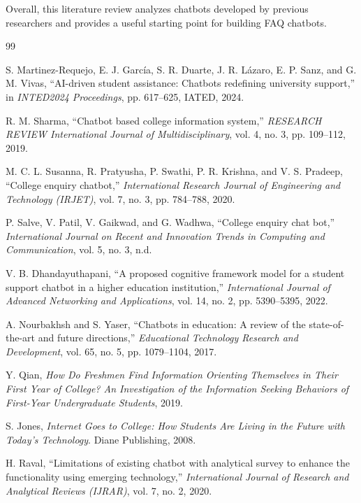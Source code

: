 \documentclass[12pt,a4paper]{article}
\begin{document}
Overall, this literature review analyzes chatbots developed by previous researchers 
and provides a useful starting point for building FAQ chatbots.


\clearpage
\begin{thebibliography}{99}

S. Martinez-Requejo, E. J. García, S. R. Duarte, J. R. Lázaro, E. P. Sanz, and G. M. Vivas, ``AI-driven student assistance: Chatbots redefining university support,'' in \textit{INTED2024 Proceedings}, pp. 617--625, IATED, 2024.

R. M. Sharma, ``Chatbot based college information system,'' \textit{RESEARCH REVIEW International Journal of Multidisciplinary}, vol. 4, no. 3, pp. 109--112, 2019.

M. C. L. Susanna, R. Pratyusha, P. Swathi, P. R. Krishna, and V. S. Pradeep, ``College enquiry chatbot,'' \textit{International Research Journal of Engineering and Technology (IRJET)}, vol. 7, no. 3, pp. 784--788, 2020.

P. Salve, V. Patil, V. Gaikwad, and G. Wadhwa, ``College enquiry chat bot,'' \textit{International Journal on Recent and Innovation Trends in Computing and Communication}, vol. 5, no. 3, n.d.

V. B. Dhandayuthapani, ``A proposed cognitive framework model for a student support chatbot in a higher education institution,'' \textit{International Journal of Advanced Networking and Applications}, vol. 14, no. 2, pp. 5390--5395, 2022.

A. Nourbakhsh and S. Yaser, ``Chatbots in education: A review of the state-of-the-art and future directions,'' \textit{Educational Technology Research and Development}, vol. 65, no. 5, pp. 1079--1104, 2017.

Y. Qian, \textit{How Do Freshmen Find Information Orienting Themselves in Their First Year of College? An Investigation of the Information Seeking Behaviors of First-Year Undergraduate Students}, 2019.

S. Jones, \textit{Internet Goes to College: How Students Are Living in the Future with Today's Technology}. Diane Publishing, 2008.

H. Raval, ``Limitations of existing chatbot with analytical survey to enhance the functionality using emerging technology,'' \textit{International Journal of Research and Analytical Reviews (IJRAR)}, vol. 7, no. 2, 2020.


\end{thebibliography}
\end{document}

